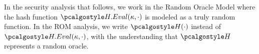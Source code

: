 \begin{remark}
  In the security analysis that follows, we work in the Random Oracle Model where the hash function $\algo{H.Eval}(\kappa, \cdot)$ is modeled as a truly random function.
  In the ROM analysis, we write $\algo{H}(\cdot)$ instead of $\algo{H.Eval}(\kappa, \cdot)$, with the understanding that $\algo{H}$ represents a random oracle.
\end{remark}

\begin{figure}[tbhp]
  \begin{center}
    \begin{tcolorbox}[width=\textwidth]
      \begin{pchstack}[center]
        \begin{pcvstack}
          \pcvspace
          \pcvspace
\end{pcvstack}
\end{pchstack}
\end{tcolorbox}
\end{center}
\end{figure}
